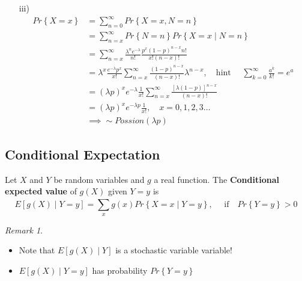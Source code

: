 \documentclass{article}
\theoremstyle{remark}
\newtheorem*{remark}{Remark}
\begin{document}
\begin{tcolorbox}
\begin{itemize}
     \item[iii)]  \[
         \begin{split}
     Pr \left \{ X=x \right \} &=    \sum_{n=0}^{\infty}  Pr \left \{ X =x, N =n \right \}  \\
     &= \sum_{n=x}^{\infty}  Pr \left \{ N =n \right \} Pr \left \{ X=x  \mid  N =n \right \}     \\
     &=  \sum_{n = x}^{ \infty}  \frac{\lambda ^{n} e^{-\lambda }}{ n! }  \frac{p^{x} \left( 1-p \right) ^{n-x} n !}{ x! \left( n -x \right)!}  \\
     &=   \lambda ^{x}\frac{e^{- \lambda } p^{x} }{x!}   \sum_{n=x}^{\infty}  \frac{\left( 1-p \right)^{n-x}}{\left( n-x \right)!} \lambda ^{n-x}, \quad \text{hint } \quad \sum_{k=0}^{\infty} \frac{a^{k}}{k!}  = e^{a} \\
        &=  \left( \lambda p \right)^{x} e^{-\lambda } \frac{1}{x!}  \sum_{n=x}^{\infty}  \frac{\left[ \lambda \left( 1-p \right) \right]^{n-x}}{\left( n-x \right)!}   \\
        &= \left( \lambda p \right)^{x} e^{-\lambda p} \frac{1}{x!}  , \quad x = 0,1,2,3 \ldots  \\
        &\implies  \sim Possion\left( \lambda p \right)  
         \end{split} 
     \]  
     \end{itemize}

   \end{tcolorbox}

   \subsection{Conditional Expectation}%
   \label{sub:conditional_expectation}

   Let $X$ and $Y$ be random variables and $g$ a real function. The \textbf{Conditional expected value}  of $g\left( X \right) $ given $Y =y$ is \[
   E \left[ g\left( X \right)  \mid  Y =y \right] = \sum_{x}^{}  g\left( x \right) Pr \left \{ X =x  \mid  Y =y \right \} , \quad \text{ if} \quad  Pr \left \{ Y =y \right \} > 0  
   \] 
   \begin{remark}
     \begin{itemize}
       \item
     Note that $E\left[ g\left( X \right)  \mid  Y \right]$ is a stochastic variable variable! 
   \item $E\left[ g\left( X \right)  \mid  Y =y \right]$ has probability $Pr \left \{ Y =y \right \} $
     \end{itemize}
   \end{remark}
\end{document}

